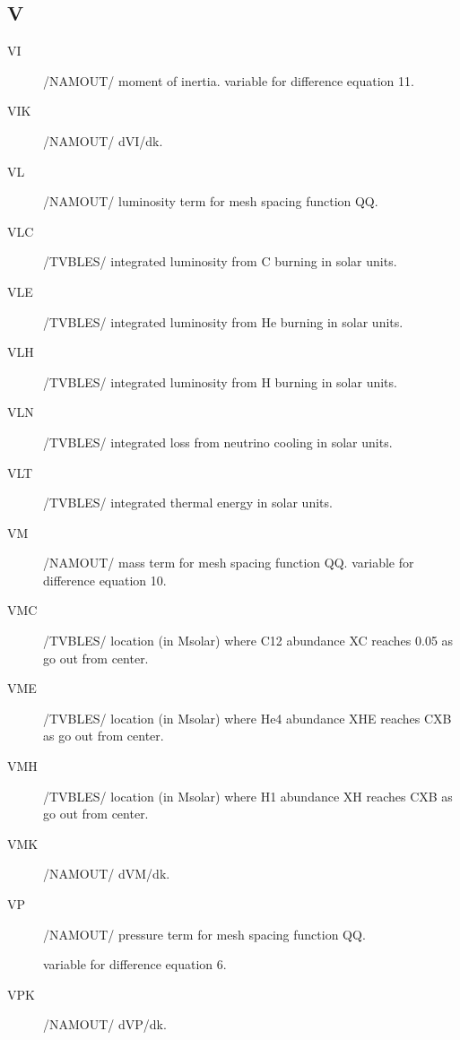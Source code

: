 \documentclass{article}
\begin{document}
\subsection*{V}
\begin{description}
    \item[VI]      	/NAMOUT/ moment of inertia.  variable for difference equation 11.

   	\item[VIK]     	/NAMOUT/ dVI/dk.

    \item[VL]      	/NAMOUT/ luminosity term for mesh spacing function QQ.

	\item[VLC]		    /TVBLES/ integrated luminosity from C burning in solar units.

	\item[VLE] 		/TVBLES/ integrated luminosity from He burning in solar units.

	\item[VLH]		    /TVBLES/ integrated luminosity from H burning in solar units.

	\item[VLN]		    /TVBLES/ integrated loss from neutrino cooling in solar units.

	\item[VLT]		    /TVBLES/ integrated thermal energy in solar units.

	\item[VM]      	/NAMOUT/ mass term for mesh spacing function QQ.  variable for difference equation 10.

	\item[VMC]		    /TVBLES/ location (in Msolar) where C12 abundance XC reaches 0.05 as go out from center.

	\item[VME]     	/TVBLES/ location (in Msolar) where He4 abundance XHE reaches CXB as go out from center.

	\item[VMH]		    /TVBLES/ location (in Msolar) where H1 abundance XH reaches CXB as go out from center.

	\item[VMK]     	/NAMOUT/ dVM/dk.

	\item[VP]      	/NAMOUT/ pressure term for mesh spacing function QQ.

	                     variable for difference equation 6.

	\item[VPK]     	/NAMOUT/ dVP/dk.


\end{description}
\end{document}
